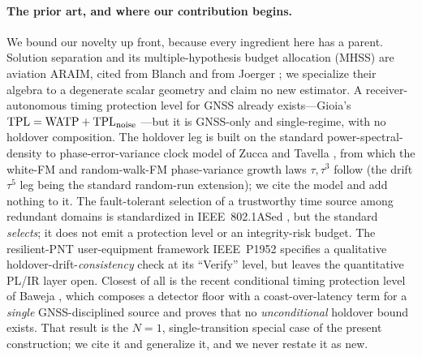 \paragraph{The prior art, and where our contribution begins.}
We bound our novelty up front, because every ingredient here has a parent.
Solution separation and its multiple-hypothesis budget allocation (MHSS) are
aviation ARAIM, cited from Blanch \citep{blanch2015} and from Joerger
\citep{joerger2014}; we specialize their algebra to a degenerate scalar geometry
and claim no new estimator. A receiver-autonomous timing protection level for
GNSS already exists---Gioia's $\mathrm{TPL}=\mathrm{WATP}+\mathrm{TPL}_{\mathrm{noise}}$
\citep{gioia2023}---but it is GNSS-only and single-regime, with no holdover
composition. The holdover leg is built on the standard power-spectral-density to
phase-error-variance clock model of Zucca and Tavella \citep{zucca2005}, from
which the white-FM and random-walk-FM phase-variance growth laws $\tau,\tau^{3}$
follow (the drift $\tau^{5}$ leg being the standard random-run extension); we cite
the model and add nothing to it. The
fault-tolerant selection of a trustworthy time source among redundant domains is
standardized in IEEE~802.1ASed \citep{ieee8021ased}, but the standard
\emph{selects}; it does not emit a protection level or an integrity-risk budget.
The resilient-PNT user-equipment framework IEEE~P1952 \citep{ieeep1952} specifies
a qualitative holdover-drift-\emph{consistency} check at its ``Verify'' level, but
leaves the quantitative PL/IR layer open. Closest of all is the recent conditional
timing protection level of Baweja \citep{baweja2026tpl}, which composes a detector
floor with a coast-over-latency term for a \emph{single} GNSS-disciplined source
and proves that no \emph{unconditional} holdover bound exists. That result is the
$N=1$, single-transition special case of the present construction; we cite it and
generalize it, and we never restate it as new.

